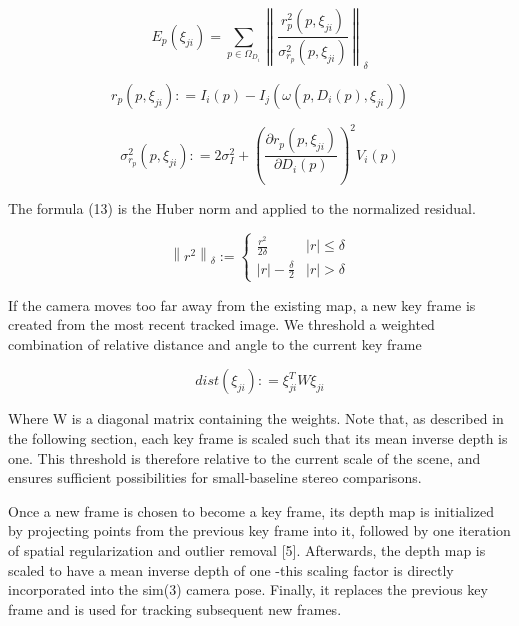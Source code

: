 \begin{equation}
E_{p}(\xi _{ji}) = \sum\limits_{p \in \Omega _{D_{i}}} \left\|  \frac{r_{p}^{2} (p,\xi_{ji})}{\sigma_{r_{p}}^{2} (p,\xi_{ji})}  \right\|_{\delta}
\end{equation}


\begin{equation}
r_{p}(p,\xi _{ji}): = I_{i}(p) - I_{j}(\omega (p,D_{i}(p),\xi _{ji}))
\end{equation}

\begin{equation}
\sigma _{r_{p}} ^{2}(p,\xi _{ji}): = 2\sigma _{I} ^{2} + {\left( \frac {\partial r_{p}(p,\xi_{ji})} {\partial D_{i} (p)} \right)^{2}} V_{i}(p)
\end{equation}

The formula (13) is the Huber norm and applied to the normalized residual.

\begin{equation}
{\left\| r^{2} \right\|_{\delta}}:=\left\{\begin{array}{ll}
\frac {r^{2}} {2\delta}            & |r|\leq \delta       \\
|r|-\frac {\delta} {2}      & |r| > \delta
\end{array} \right.
\end{equation}




If the camera moves too far away from the existing map, a new key frame is created from the most recent tracked image. We threshold a weighted combination of relative distance and angle to the current key frame

\begin{equation}
dist({\xi _{ji}}): = \xi _{ji}^TW{\xi _{ji}}
\end{equation}

Where W is a diagonal matrix containing the weights. Note that, as described in the following section, each key frame is scaled such that its mean inverse depth is one. This threshold is therefore relative to the current scale of the scene, and ensures sufficient possibilities for small-baseline stereo comparisons.

Once a new frame is chosen to become a key frame, its depth map is initialized by projecting points from the previous key frame into it, followed by one iteration of spatial regularization and outlier removal [5]. Afterwards, the depth map is scaled to have a mean inverse depth of one -this scaling factor is directly incorporated into the sim(3) camera pose. Finally, it replaces the previous key frame and is used for tracking subsequent new frames.

